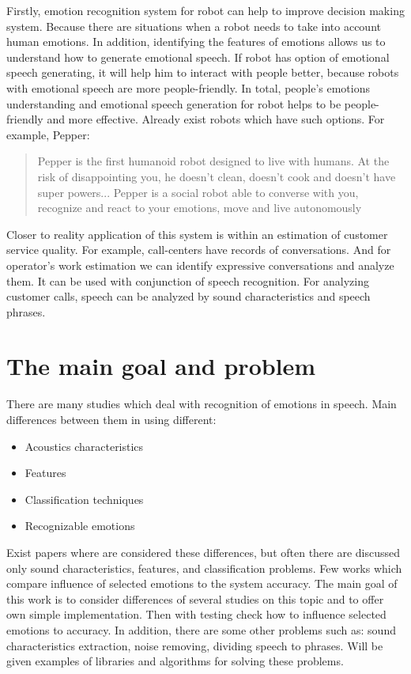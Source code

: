 \documentclass[14pt]{extarticle}
\begin{document}
Firstly, emotion recognition system for robot can help to improve decision making system. Because there are situations when a robot needs to take into account human emotions. In addition, identifying the features of emotions allows us to understand how to generate emotional speech. If robot has option of emotional speech generating, it will help him to interact with people better, because robots with emotional speech are more people-friendly. In total, people's emotions understanding and emotional speech generation for robot helps to be people-friendly and more effective. Already exist robots which have such options. For example, Pepper:
\begin{quote}
	Pepper is the first humanoid robot designed to live with humans. At the risk of disappointing you, he doesn't clean, doesn't cook and doesn't have super powers... Pepper is a social robot able to converse with you, recognize and react to your emotions, move and live autonomously\cite{pepper}
\end{quote}
Closer to reality application of this system is within an estimation of customer service quality. For example, call-centers have records of conversations. And for operator's work estimation we can identify expressive conversations and analyze them. It can be used with conjunction of speech recognition. For analyzing customer calls, speech can be analyzed by sound characteristics and speech phrases.

\section{The main goal and problem}

There are many studies which deal with recognition of emotions in speech. Main differences between them in using different:
\begin{itemize}
	\item Acoustics characteristics
	\item Features
	\item Classification techniques
	\item Recognizable emotions
\end{itemize}

Exist papers where are considered these differences, but often there are discussed only sound characteristics, features, and classification problems. Few works which compare influence of selected emotions to the system accuracy. The main goal of this work is to consider differences of several studies on this topic and to offer own simple implementation. Then with testing check how to influence selected emotions to accuracy.
In addition, there are some other problems such as: sound characteristics extraction, noise removing, dividing speech to phrases. Will be given examples of libraries and algorithms for solving these problems.
\end{document}
